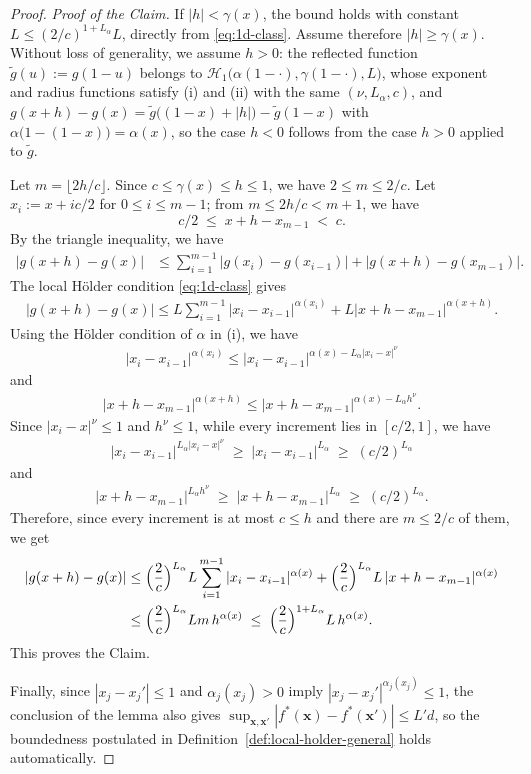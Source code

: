 \documentclass[11pt]{article}
\theoremstyle{plain}
\theoremstyle{definition}
\theoremstyle{remark}
\theoremstyle{plain}
\newcommand{\bx}{\mathbf{x}}
\newcommand{\1}{\mathbbm{1}}
\begin{document}
\begin{proof}
\medskip
\noindent\emph{Proof of the Claim.} If $\lvert h\rvert<\gamma(x)$, the
bound holds with constant $L\le (2/c)^{1+L_\alpha}L$, directly from
\eqref{eq:1d-class}. Assume therefore $\lvert h\rvert\ge\gamma(x)$.
Without loss of generality, we assume $h>0$: the reflected function
$\tilde g(u):=g(1-u)$ belongs to
$\mathcal{H}_1\bigl(\alpha(1-\cdot),\gamma(1-\cdot),L\bigr)$,
whose exponent and radius functions satisfy (i) and (ii) with the same
$(\nu,L_\alpha,c)$, and
$g(x+h)-g(x)=\tilde g\bigl((1-x)+\lvert h\rvert\bigr)-\tilde g(1-x)$
with $\alpha\bigl(1-(1-x)\bigr)=\alpha(x)$, so the case $h<0$ follows
from the case $h>0$ applied to $\tilde g$.

Let $m=\lfloor 2h/c\rfloor$. Since $c\le\gamma(x)\le h\le 1$, we have
$2\le m\le 2/c$. Let $x_i:=x+ic/2$ for $0\le i\le m-1$; from
$m\le 2h/c<m+1$, we have
\[
  c/2 \;\le\; x+h-x_{m-1} \;<\; c .
\]
By the triangle inequality, we have
\begin{align*}
|g(x+h)-g(x)|&\leq \sum_{i=1}^{m-1} |g(x_i)-g(x_{i-1})|
  + |g(x+h)-g(x_{m-1})|.
\end{align*}
The local
H\"older condition \eqref{eq:1d-class} gives
\begin{align*}
|g(x+h)-g(x)|\leq L\sum_{i=1}^{m-1}|x_i-x_{i-1}|^{\alpha(x_i)}
  + L|x+h-x_{m-1}|^{\alpha(x+h)}.
\end{align*}
Using the H\"older condition of $\alpha$ in (i), we have
\begin{align*}
|x_i-x_{i-1}|^{\alpha(x_i)}\leq
|x_i-x_{i-1}|^{\alpha(x)-L_\alpha|x_i-x|^{\nu}}
\end{align*}
and
\begin{align*}
|x+h-x_{m-1}|^{\alpha(x+h)}\leq
|x+h-x_{m-1}|^{\alpha(x)-L_\alpha h^{\nu}}.
\end{align*}
Since $|x_i-x|^{\nu}\le 1$ and $h^{\nu}\le 1$, while every increment
lies in $[c/2,1]$, we have
\begin{align*}
|x_i-x_{i-1}|^{L_\alpha|x_i-x|^{\nu}}
\;\geq\; |x_i-x_{i-1}|^{L_\alpha}
\;\geq\; (c/2)^{L_\alpha}
\end{align*}
and
\begin{align*}
|x+h-x_{m-1}|^{L_\alpha h^{\nu}}
\;\geq\; |x+h-x_{m-1}|^{L_\alpha}
\;\geq\; (c/2)^{L_\alpha}.
\end{align*}
Therefore, since every increment is at most $c\le h$ and there are
$m\le 2/c$ of them, we get
\begin{align*}
|g(x+h)-g(x)|& \leq
\Bigl(\frac{2}{c}\Bigr)^{L_\alpha}
L\sum_{i=1}^{m-1}|x_i-x_{i-1}|^{\alpha(x)}
  + \Bigl(\frac{2}{c}\Bigr)^{L_\alpha} L\,
  |x+h-x_{m-1}|^{\alpha(x)}\\
& \leq \Bigl(\frac{2}{c}\Bigr)^{L_\alpha} L m\, h^{\alpha(x)}
\;\leq\; \Bigl(\frac{2}{c}\Bigr)^{1+L_\alpha} L\, h^{\alpha(x)}.
\end{align*}
This proves the Claim.

\medskip
Finally, since $|x_j-x_j'|\le 1$ and $\alpha_j(x_j)>0$ imply
$|x_j-x_j'|^{\alpha_j(x_j)}\le1$, the conclusion of the lemma also
gives $\sup_{\bx,\bx'}|f^*(\bx)-f^*(\bx')|\le L'd$, so the boundedness
postulated in Definition~\ref{def:local-holder-general} holds
automatically.
\end{proof}
\end{document}
